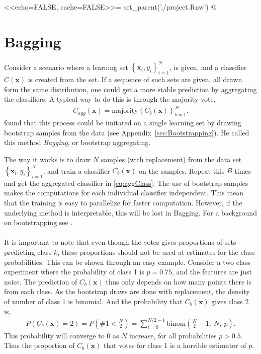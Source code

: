 <<echo=FALSE, cache=FALSE>>=
set_parent('./project.Rnw')
@
\section{Bagging}
\label{sec:Bagging}
Consider a scenario where a learning set $\left\{ \mathbf{x}_i, y_i \right\}_{i=1}^{N}$, is given, and a classifier $C(\mathbf{x})$ is created from the set. If a sequence of such sets are given, all drawn form the same distribution, one could get a more stable prediction by aggregating the classifiers. A typical way to do this is through the majority vote,
\begin{align}
  \label{eq:aggClass} 
  C_{agg}(\mathbf{x}) = \mathrm{majority} \left\{ C_b(\mathbf{x}) \right\}_{b=1}^{B}.
\end{align}
\cite{Breiman1996} found that this process could be imitated on a single learning set by drawing bootstrap samples from the data (see Appendix~\ref{sec:Bootstrapping}). He called this method \textit{Bagging}, or bootstrap aggregating. 

The way it works is to draw $N$ samples (with replacement) from the data set $\left\{ \mathbf{x}_i, y_i \right\}_{i=1}^{N}$, and train a classifier $C_b(\mathbf{x})$ on the samples. Repeat this $B$ times and get the aggregated classifier in  \eqref{eq:aggClass}. The use of bootstrap samples makes the computations for each individual classifier independent. This mean that the training is easy to parallelize for faster computation. However, if the underlying method is interpretable, this will be lost in Bagging.
For a background on bootstrapping see \cite{efron1994bootstrap}.
\\
\\
It is important to note that even though the votes gives proportions of sets predicting class $k$, these proportions should not be used at estimates for the class probabilities. This can be shown through an easy example. Consider a two class experiment where the probability of class 1 is $p = 0.75$, and the features are just noise. The prediction of $C_b(\mathbf{x})$ thus only depends on how many points there is from each class. As the bootstrap draws are done with replacement, the density of number of class 1 is binomial. And the probability that $C_b(\mathbf{x})$ gives class 2 is,
\begin{align}
  P(C_b(\mathbf{x})=2) = P\left(\#1 <  \frac{N}{2} \right) = \sum_{i = 0}^{N/2 - 1} \mathrm{binom}\left(\frac{N}{2}-1,\: N,\: p  \right).
\end{align}
This probability will converge to 0 as $N$ increase, for all probabilities $p > 0.5$. Thus the proportion of $C_b(\mathbf{x})$ that votes for class 1 is a horrible estimator of $p$.

